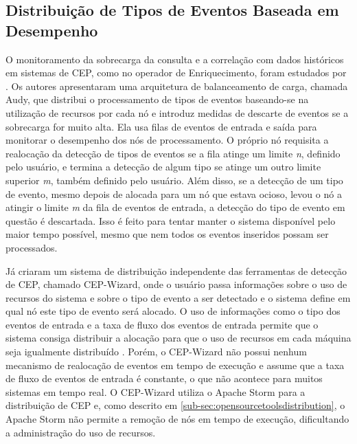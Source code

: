 \subsection{Distribuição de Tipos de Eventos Baseada em Desempenho}
\label{sec:performanceBased}

O monitoramento da sobrecarga da consulta e a correlação com dados históricos em sistemas de CEP, como no operador de Enriquecimento, foram estudados por \cite{6906776}. Os autores apresentaram uma arquitetura de balanceamento de carga, chamada Audy, que distribui o processamento de tipos de eventos baseando-se na utilização de recursos por cada nó e introduz medidas de descarte de eventos se a sobrecarga for muito alta. Ela usa filas de eventos de entrada e saída para monitorar o desempenho dos nós de processamento. O próprio nó requisita a realocação da detecção de tipos de eventos se a fila atinge um limite \textit{n}, definido pelo usuário, e termina a detecção de algum tipo se atinge um outro limite superior \textit{m}, também definido pelo usuário. Além disso, se a detecção de um tipo de evento, mesmo depois de alocada para um nó que estava ocioso, levou o nó a atingir o limite \textit{m} da fila de eventos de entrada, a detecção do tipo de evento em questão é descartada. Isso é feito para tentar manter o sistema disponível pelo maior tempo possível, mesmo que nem todos os eventos inseridos possam ser processados. 

Já \cite{shin2019cep} criaram um sistema de distribuição independente das ferramentas de detecção de CEP, chamado CEP-Wizard, onde o usuário passa informações sobre o uso de recursos do sistema e sobre o tipo de evento a ser detectado e o sistema define em qual nó este tipo de evento será alocado. O uso de informações como o tipo dos eventos de entrada e a taxa de fluxo dos eventos de entrada permite que o sistema consiga distribuir a alocação para que o uso de recursos em cada máquina seja igualmente distribuído%
. Porém, o CEP-Wizard não possui nenhum mecanismo de realocação de eventos em tempo de execução e assume que a taxa de fluxo de eventos de entrada é constante, o que não acontece para muitos sistemas em tempo real. O CEP-Wizard utiliza o Apache Storm para a distribuição de CEP e, como descrito em \ref{sub-sec:opensourcetoolsdistribution},
o Apache Storm não permite a remoção de nós em tempo de execução, dificultando a administração do uso de recursos.


